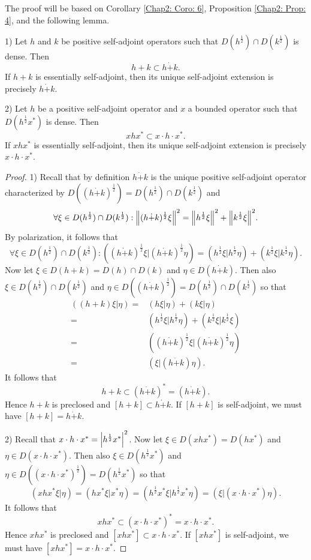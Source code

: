 The proof will be based on Corollary \ref{Chap2: Coro: 6}, Proposition \ref{Chap2: Prop: 4}, and the following lemma.
\begin{lemma}\label{Chap2: lemma: 8}
    1) Let $h$ and $k$ be positive self-adjoint operators such that $D(h^\frac{1}{2})\cap D(k^\frac{1}{2})$ is dense. Then
    \[
        h+k\subset h\dot{+}k.
    \]
    If $h+k$ is essentially self-adjoint, then its unique self-adjoint extension is precisely $h\dot{+}k$.\par
    2) Let $h$ be a positive self-adjoint operator and $x$ a bounded operator such that $D(h^\frac{1}{2}x^*)$ is dense. Then
    \[
        xhx^*\subset x\cdot h\cdot x^*.
    \]
    If $xhx^*$ is essentially self-adjoint, then its unique self-adjoint extension is precisely $x\cdot h\cdot x^*$.
\end{lemma}
\begin{proof}
    1) Recall that by definition $h\dot{+}k$ is the unique positive self-adjoint operator characterized by $D((h\dot{+}k)^\frac{1}{2})=D(h^\frac{1}{2})\cap D(k^\frac{1}{2})$ and
    \begin{equation}
        \forall \xi\in D(h^\frac{1}{2})\cap D(k^\frac{1}{2}):\norm{(h\dot{+}k)^\frac{1}{2}\xi}^2=\norm{h^\frac{1}{2}\xi}^2+\norm{k^\frac{1}{2}\xi}^2.
    \end{equation}
    By polarization, it follows that
    \[
        \forall \xi\in D(h^\frac{1}{2})\cap D(k^\frac{1}{2}):((h\dot{+}k)^\frac{1}{2}\xi|(h\dot{+}k)^\frac{1}{2}\eta)=(h^\frac{1}{2}\xi|h^\frac{1}{2}\eta)+(k^\frac{1}{2}\xi|k^\frac{1}{2}\eta).
    \]
    Now let $\xi\in D(h+k)=D(h)\cap D(k)$ and $\eta\in D(h\dot{+}k)$. Then also $\xi\in D(h^\frac{1}{2})\cap D(k^\frac{1}{2})$ and $\eta\in D((h\dot{+}k)^\frac{1}{2})=D(h^\frac{1}{2})\cap D(k^\frac{1}{2})$ so that
    \[
        \begin{split}
            ((h+k)\xi|\eta)=&(h\xi|\eta)+(k\xi|\eta)\\
            =&(h^\frac{1}{2}\xi|h^\frac{1}{2}\eta)+(k^\frac{1}{2}\xi|k^\frac{1}{2}\xi)\\
            =&((h\dot{+}k)^\frac{1}{2}\xi|(h\dot{+}k)^\frac{1}{2}\eta)\\
            =&(\xi|(h\dot{+}k)\eta).
        \end{split}
    \]
    It follows that
    \[
        h+k\subset (h\dot{+}k)^*=(h\dot{+}k).
    \]
    Hence $h+k$ is preclosed and $[h+k]\subset h\dot{+}k$. If $[h+k]$ is self-adjoint, we must have $[h+k]=h\dot{+}k$.\par
    2) Recall that $x\cdot h\cdot x^*=\abs{h^\frac{1}{2}x^*}^2$. Now let $\xi\in D(xhx^*)=D(hx^*)$ and $\eta\in D(x\cdot h\cdot x^*)$. Then also $\xi\in D(h^\frac{1}{2}x^*)$ and $\eta\in D((x\cdot h\cdot x^*)^\frac{1}{2})=D(h^\frac{1}{2}x^*)$ so that
    \[
        (xhx^* \xi|\eta)=(hx^*\xi|x^* \eta)=(h^\frac{1}{2}x^*\xi|h^\frac{1}{2}x^*\eta)=(\xi|(x\cdot h\cdot x^*)\eta).
    \]
    It follows that
    \[
        xhx^*\subset(x\cdot h\cdot x^*)^*=x\cdot h\cdot x^*.
    \]
    Hence $xhx^*$ is preclosed and $[xhx^*]\subset x\cdot h\cdot x^*$. If $[xhx^*]$ is self-adjoint, we must have $[xhx^*]=x\cdot h\cdot x^*$.
\end{proof}
